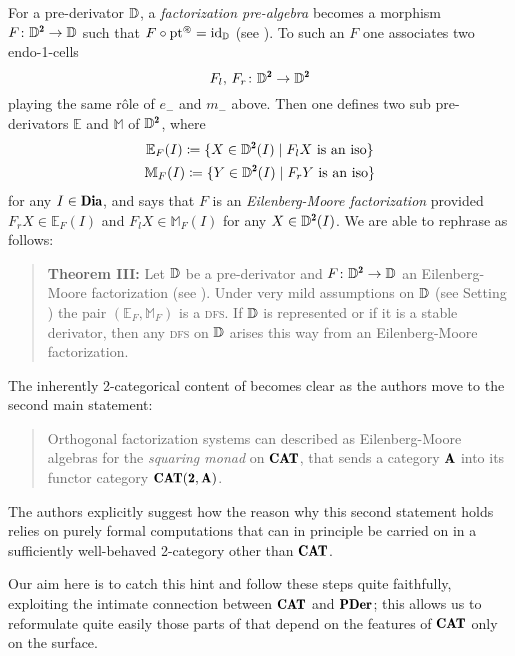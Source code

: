 For a pre-derivator $\mathbb{D}$, a \emph{factorization pre-algebra}  becomes a morphism  $F\colon \D^\due\to \D$ such that $F\circ \text{pt}^\protect{\tiny \oast}=\operatorname{id}_{\mathbb{D}}$ (see \adef{}). To such an $F$ one associates two endo-1-cells 
\[
F_l,\, F_r\colon \D^\due\to \D^\due
\]
playing the same r\^ole of $e_{-}$ and $m_{-}$ above. Then one defines two sub pre-derivators $\mathbb E$ and $\mathbb M$ of $\D^\due$, where
\begin{gather*}
\mathbb E_F(I) \coloneqq \{X\in \D^\due(I) \mid F_lX\text{ is an iso}\}\\
\mathbb M_F(I) \coloneqq \{Y\in \D^\due(I) \mid F_rY\text{ is an iso}\}
\end{gather*}
for any $I\in \Dia$, and says that $F$ is an \emph{Eilenberg\hyp{}Moore factorization} provided $F_rX\in \mathbb E_F(I)$ and $F_lX\in \mathbb M_F(I)$ for any $X\in \D^\due(I)$. We are able to rephrase \cite[\athm\textbf{A}]{Korostenski199357} as follows:
\begin{quote}
\textbf{Theorem III:}
Let $\mathbb{D}$ be a pre-derivator and  $F\colon \D^\due\to \D$ an Eilenberg\hyp{}Moore factorization  (see \adef{}). Under very mild assumptions on $\mathbb{D}$ (see Setting )  the pair $(\mathbb E_F,\mathbb M_F)$ is a \textsc{dfs}. If $\mathbb{D}$ is represented or if it is a stable derivator, then any \textsc{dfs} on $\mathbb{D}$ arises this way from an Eilenberg\hyp{}Moore factorization.
\end{quote}
The inherently 2-categorical content of \cite{Korostenski199357} becomes clear as the authors move to the second main statement: \cite[\athm\textbf{B}]{Korostenski199357}
\begin{quote}
Orthogonal factorization systems can described as Eilenberg\hyp{}Moore algebras for the \emph{squaring monad} on $\Cat$, that sends a category $\A$ into its functor category $\Cat(\due,\A)$.
\end{quote}
The authors explicitly suggest how the reason why this second statement holds relies on purely formal computations that can in principle be carried on in a sufficiently well\hyp{}behaved 2-category other than $\Cat$.

Our aim here is to catch this hint and follow these steps quite faithfully, exploiting the intimate connection between $\Cat$ and $\PDer$; this allows us to reformulate quite easily those parts of \cite{Korostenski199357} that depend on the features of $\Cat$ only on the surface.

